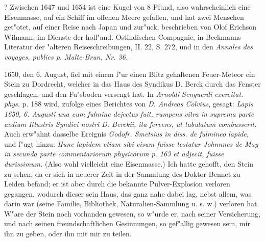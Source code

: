 \documentclass[a4paper, 11pt, oneside, polutonikogreek, german]{article}
\begin{document}
? Zwischen 1647 und 1654 ist eine Kugel von 8 Pfund, also wahrscheinlich eine Eisenmasse, auf ein Schiff im offenen Meere gefallen, und hat zwei Menschen get"otet, auf einer Reise nach Japan und zur"uck, beschrieben von Olof Erichson Wilmann, im Dienste der holl"and. Ostindischen Compagnie, in Beckmanns Literatur der "alteren Reiseschreibungen, II. 22, S. 272, und in den \emph{Annales des voyages, publies p. Malte-Brun, Nr. 36.}

1650, den 6. August, fiel mit einem f"ur einen Blitz gehaltenen Feuer-Meteor ein Stein zu Dordrecht, welcher in das Haus des Syndikus D. Berck durch das Fenster geschlagen, und den Fu"sboden versengt hat. In \emph{Arnoldi Senguerdi exercitat. phys.} p. 188 wird, zufolge eines Berichtes von \emph{D. Andreas Colvius}, gesagt: \emph{Lapis 1650, 6. Augusti una cum fulmine dejectus fuit, rumpens vitra in suprema parte aedium Illustris Syndici nostri D. Berckii, ita fervens, ut tabulatum combusserit.} Auch erw"ahnt dasselbe Ereignis \emph{Godofr. Smetsius in diss. de fulmineo lapide}, und f"ugt hinzu: \emph{Hunc lapidem etiam sibi visum fuisse testatur Johnnnes de May in secunda parte commentariorum physicorum p. 163 et adjecit, fuisse durissimum.} (Also wohl vielleicht eine Eisenmasse.) Ich hatte gehofft, den Stein zu sehen, da er sich in neuerer Zeit in der Sammlung des Doktor Bennet zu Leiden befand; er ist aber durch die bekannte Pulver-Explosion verloren gegangen, wodurch dieser sein Haus, das ganz nahe dabei lag, nebst allem, was darin war (seine Familie, Bibliothek, Naturalien-Sammlung u. s. w.) verloren hat. W"are der Stein noch vorhanden gewesen, so w"urde er, nach seiner Versicherung, und nach seinen freundschaftlichen Gesinnungen, so gef"allig gewesen sein, mir ihn zu geben, oder ihn mit mir zu teilen.
\end{document}
